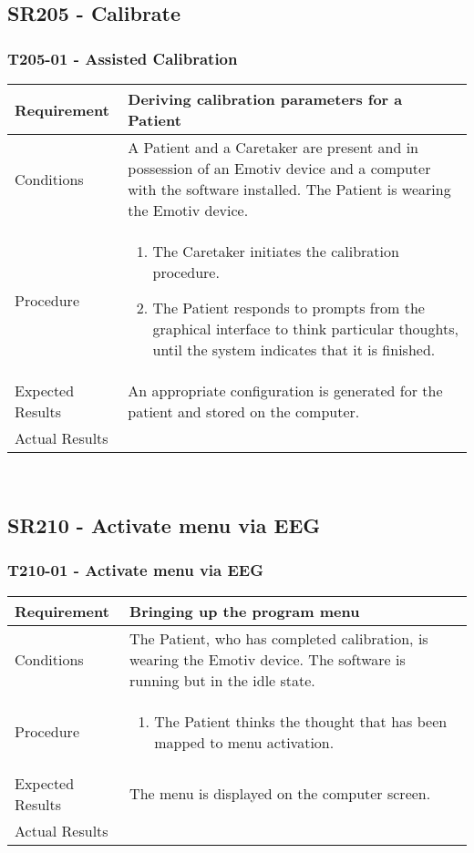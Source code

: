 \documentclass{article}
\begin{document}
\subsection{SR205 - Calibrate}
\subsubsection{T205-01 - Assisted Calibration}
\begin{tabular}{| l | p{12cm} |}
    \hline
	Requirement & Deriving calibration parameters for a Patient \\ \hline
	Conditions & A Patient and a Caretaker are present and in possession of an
	Emotiv device and a computer with the software installed. The Patient is
	wearing the Emotiv device. \\ \hline
    Procedure &
\begin{enumerate}
    \item The Caretaker initiates the calibration procedure.
    \item The Patient responds to prompts from the graphical interface to
        think particular thoughts, until the system indicates that it is
        finished.
\end{enumerate} \\ \hline
	Expected Results & An appropriate configuration is generated for the
patient and stored on the computer. \\ \hline
Actual Results & \vspace{1cm} \\ \hline
\end{tabular}

\hfill \\

\subsection{SR210 - Activate menu via EEG}
\subsubsection{T210-01 - Activate menu via EEG}
\begin{tabular}{| l | p{12cm} |}
    \hline
	Requirement & Bringing up the program menu \\ \hline
	Conditions & The Patient, who has completed calibration, is wearing the
	Emotiv device. The software is running but in the idle state. \\ \hline
	Procedure &
\begin{enumerate}
	\item The Patient thinks the thought that has been mapped to menu
	    activation.
\end{enumerate} \\ \hline
	Expected Results & The menu is displayed on the computer screen. \\ \hline
	Actual Results & \vspace{1cm} \\ \hline
\end{tabular}
\end{document}
